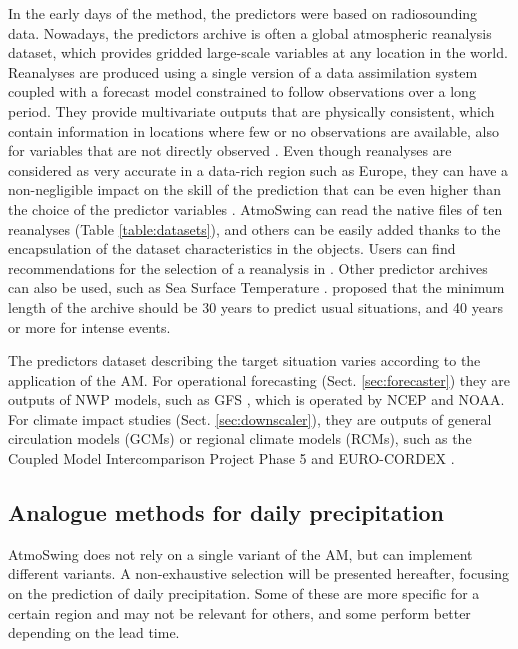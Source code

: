 \documentclass[review]{elsarticle}
\begin{document}
In the early days of the method, the predictors were based on radiosounding data. Nowadays, the predictors archive is often a global atmospheric reanalysis dataset, which provides gridded large-scale variables at any location in the world. Reanalyses are produced using a single version of a data assimilation system coupled with a forecast model constrained to follow observations over a long period. They provide multivariate outputs that are physically consistent, which contain information in locations where few or no observations are available, also for variables that are not directly observed \citep{Gelaro2017}. Even though reanalyses are considered as very accurate in a data-rich region such as Europe, they can have a non-negligible impact on the skill of the prediction that can be even higher than the choice of the predictor variables \cite{Dayon2015, Horton2018b}. AtmoSwing can read the native files of ten reanalyses (Table \ref{table:datasets}), and others can be easily added thanks to the encapsulation of the dataset characteristics in the objects. Users can find recommendations for the selection of a reanalysis in \cite{Horton2018b}. Other predictor archives can also be used, such as Sea Surface Temperature \citep[SST, ][]{Reynolds2007}. \citet{Bontron2004} proposed that the minimum length of the archive should be 30 years to predict usual situations, and 40 years or more for intense events.

The predictors dataset describing the target situation varies according to the application of the AM. For operational forecasting (Sect. \ref{sec:forecaster}) they are outputs of NWP models, such as GFS \citep[Global Forecast System,][]{Kanamitsu1991,Kanamitsu1989}, which is operated by NCEP and NOAA. For climate impact studies (Sect. \ref{sec:downscaler}), they are outputs of general circulation models (GCMs) or regional climate models (RCMs), such as the Coupled Model Intercomparison Project Phase 5 \citep[CMIP5,][]{Taylor2012} and EURO-CORDEX \citep{Jacob2014}.


\subsection{Analogue methods for daily precipitation}
\label{sec:method}

AtmoSwing does not rely on a single variant of the AM, but can implement different variants. A non-exhaustive selection will be presented hereafter, focusing on the prediction of daily precipitation. Some of these are more specific for a certain region and may not be relevant for others, and some perform better depending on the lead time.
\end{document}

